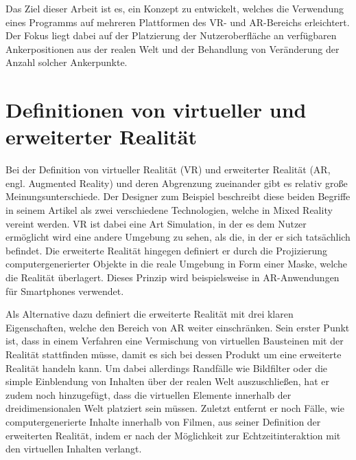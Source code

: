	
	Das Ziel dieser Arbeit ist es, ein Konzept zu entwickelt, welches die Verwendung eines Programms auf mehreren Plattformen des VR- und AR-Bereichs erleichtert. Der Fokus liegt dabei auf der Platzierung der Nutzeroberfläche an verfügbaren Ankerpositionen aus der realen Welt und der Behandlung von Veränderung der Anzahl solcher Ankerpunkte.
	
	\section{Definitionen von virtueller und erweiterter Realität}
	Bei der Definition von virtueller Realität (VR) und erweiterter Realität (AR, engl. Augmented Reality) und deren Abgrenzung zueinander gibt es relativ große Meinungsunterschiede. Der Designer  zum Beispiel beschreibt diese beiden Begriffe in seinem Artikel  als zwei verschiedene Technologien, welche in Mixed Reality vereint werden. VR ist dabei eine Art Simulation, in der es dem Nutzer ermöglicht wird eine andere Umgebung zu sehen, als die, in der er sich tatsächlich befindet. Die erweiterte Realität hingegen definiert er durch die Projizierung computergenerierter Objekte in die reale Umgebung in Form einer Maske, welche die Realität überlagert.
	Dieses Prinzip wird beispielsweise in AR-Anwendungen für Smartphones verwendet.\cite{tidjane}
	
	Als Alternative dazu definiert  die erweiterte Realität mit drei klaren Eigenschaften, welche den Bereich von AR weiter einschränken. Sein erster Punkt ist, dass in einem Verfahren eine Vermischung von virtuellen Bausteinen mit der Realität stattfinden müsse, damit es sich bei dessen Produkt um eine erweiterte Realität handeln kann. Um dabei allerdings Randfälle wie Bildfilter oder die simple Einblendung von Inhalten über der realen Welt auszuschließen, hat er zudem noch hinzugefügt, dass die virtuellen Elemente innerhalb der dreidimensionalen Welt platziert sein müssen. Zuletzt entfernt er noch Fälle, wie computergenerierte Inhalte innerhalb von Filmen, aus seiner Definition der erweiterten Realität, indem er nach der Möglichkeit zur Echtzeitinteraktion mit den virtuellen Inhalten verlangt.\cite{azuma}
	
	
	
